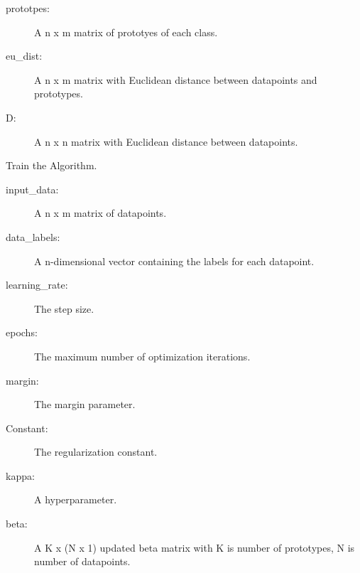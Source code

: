 \documentclass[letterpaper,10pt,english]{sphinxmanual}
\begin{document}
\begin{fulllineitems}
\begin{fulllineitems}
\begin{description}
\item[{prototpes:}] \leavevmode
A n x m matrix of prototyes of each class.

\end{description}
\begin{description}
\item[{eu\_dist:}] \leavevmode
A n x m matrix with Euclidean distance between datapoints and
prototypes.

\item[{D:}] \leavevmode
A n x n matrix with Euclidean distance between datapoints.

\end{description}

\end{fulllineitems}


\begin{fulllineitems}
\label{\detokenize{index:lmlvq_distance.LMLVQ.fit}}
Train the Algorithm.
\begin{description}
\item[{input\_data:}] \leavevmode
A n x m matrix of datapoints.

\item[{data\_labels:}] \leavevmode
A n-dimensional vector containing the labels for each
datapoint.

\item[{learning\_rate:}] \leavevmode
The step size.

\item[{epochs:}] \leavevmode
The maximum number of optimization iterations.

\item[{margin:}] \leavevmode
The margin parameter.

\item[{Constant:}] \leavevmode
The regularization constant.

\item[{kappa:}] \leavevmode
A hyperparameter.

\end{description}
\begin{description}
\item[{beta:}] \leavevmode
A K x (N x 1) updated beta matrix with K is number of prototypes,
N is number of datapoints.


\end{description}
\end{fulllineitems}
\end{fulllineitems}
\end{document}

